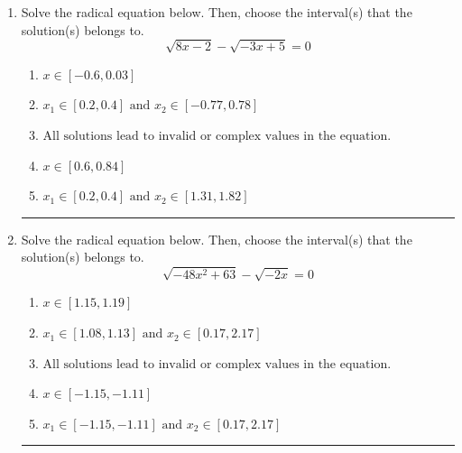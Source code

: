 \documentclass[14pt]{extbook}
\newcommand{\litem}[1]{\item#1\hspace*{-1cm}\rule{\textwidth}{0.4pt}}
\begin{document}
\begin{enumerate}
\litem{
Solve the radical equation below. Then, choose the interval(s) that the solution(s) belongs to.\[ \sqrt{8 x - 2} - \sqrt{-3 x + 5} = 0 \]\begin{enumerate}[label=\Alph*.]
\item \( x \in [-0.6,0.03] \)
\item \( x_1 \in [0.2, 0.4] \text{ and } x_2 \in [-0.77,0.78] \)
\item \( \text{All solutions lead to invalid or complex values in the equation.} \)
\item \( x \in [0.6,0.84] \)
\item \( x_1 \in [0.2, 0.4] \text{ and } x_2 \in [1.31,1.82] \)

\end{enumerate} }
\litem{
Solve the radical equation below. Then, choose the interval(s) that the solution(s) belongs to.\[ \sqrt{-48 x^2 + 63} - \sqrt{-2 x} = 0 \]\begin{enumerate}[label=\Alph*.]
\item \( x \in [1.15,1.19] \)
\item \( x_1 \in [1.08, 1.13] \text{ and } x_2 \in [0.17,2.17] \)
\item \( \text{All solutions lead to invalid or complex values in the equation.} \)
\item \( x \in [-1.15,-1.11] \)
\item \( x_1 \in [-1.15, -1.11] \text{ and } x_2 \in [0.17,2.17] \)


\end{enumerate}}
\end{enumerate}
\end{document}
